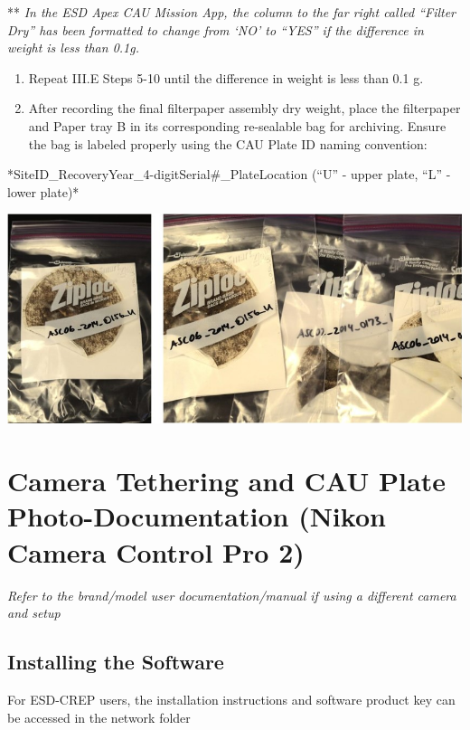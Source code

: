 \documentclass[
]{book}
\begin{document}
** \emph{In the ESD Apex CAU Mission App, the column to the far right called ``Filter Dry'' has been formatted to change from `NO' to ``YES'' if the difference in weight is less than 0.1g.}

\begin{enumerate}
\def\labelenumi{\arabic{enumi}.}
\setcounter{enumi}{10}
\item
  Repeat III.E Steps 5-10 until the difference in weight is less than 0.1 g.
\item
  After recording the final filterpaper assembly dry weight, place the filterpaper and Paper tray B in its corresponding re-sealable bag for archiving. Ensure the bag is labeled properly using the CAU Plate ID naming convention:
\end{enumerate}

*SiteID\_RecoveryYear\_4-digitSerial\#\_PlateLocation (``U'' - upper plate, ``L'' - lower plate)*

\includegraphics{images/CAU_bag.jpg}

\hypertarget{camera-tethering-and-cau-plate-photo-documentation-nikon-camera-control-pro-2}{%
\section{Camera Tethering and CAU Plate Photo-Documentation (Nikon Camera Control Pro 2)}\label{camera-tethering-and-cau-plate-photo-documentation-nikon-camera-control-pro-2}}

\emph{Refer to the brand/model user documentation/manual if using a different camera and setup}

\hypertarget{installing-the-software}{%
\subsection{Installing the Software}\label{installing-the-software}}

For ESD-CREP users, the installation instructions and software product key can be accessed in the network folder
\end{document}
